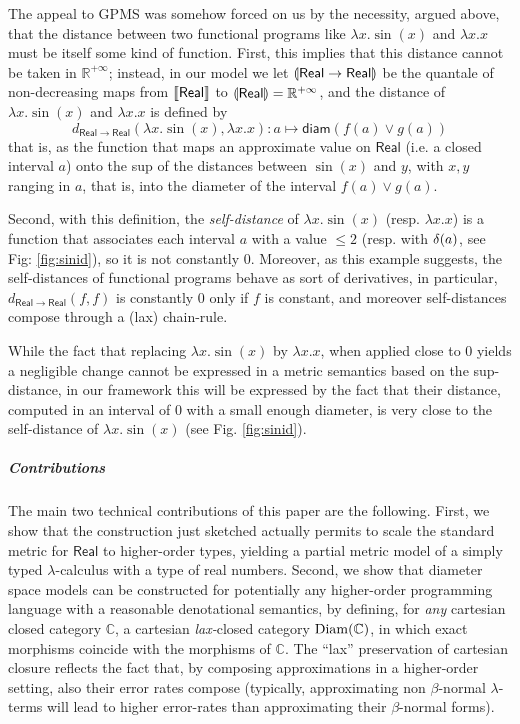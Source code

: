 The appeal to GPMS was somehow forced on us by the necessity, argued above, that the distance between two functional programs like $\lambda x.\sin(x)$ and $\lambda x.x$ must be itself some kind of function. First, this implies that this distance cannot be taken in $\mathbb R^{+\infty}$; instead, in our model 
we let $\llparenthesis \mathsf{Real}\to\mathsf{Real} \rrparenthesis$ be the quantale of non-decreasing maps from $\llbracket \mathsf{Real} \rrbracket$ to $\llparenthesis \mathsf{Real} \rrparenthesis=\mathbb R^{+\infty}$, and the distance of  $\lambda x.\sin(x)$ and $\lambda x.x$ is defined by 
$$ d_{\mathsf{Real}\to\mathsf{Real}}(\lambda x.\sin(x),\lambda x.x): a \mapsto \mathsf{diam}(f(a)\vee g(a))$$
that is, as the function that maps an approximate value on $\mathsf{Real}$ (i.e. a closed interval $a$) onto the sup of the distances between $\sin(x)$ and $ y$, with $x,y$ ranging in $a$, that is, into the diameter of the interval $f(a)\vee g(a)$. 


Second, with this definition, the \emph{self-distance} of $\lambda x.\sin(x)$ (resp. $\lambda x.x$)  is a function that associates each interval $a$ with a value $\leq 2$ (resp. with $\delta(a)$, see Fig: \ref{fig:sinid}), so it is not constantly 0. Moreover, as this example suggests, the self-distances of functional programs behave as sort of derivatives, in particular, $ d_{\mathsf{Real}\to\mathsf{Real}}(f,f)$ is constantly 0 only if $f$ is constant, and moreover self-distances 
 compose through a (lax) chain-rule.


While the fact that replacing  $\lambda x.\sin(x)$ by $\lambda x.x$, when applied close to 0 yields a negligible change cannot be expressed in a metric semantics based on the sup-distance, in our framework this will be expressed by the fact that their distance, computed in an interval of 0 with a small enough diameter, is very close to the {self-distance} of $\lambda x.\sin(x)$ (see Fig. \ref{fig:sinid}). 







\subparagraph*{Contributions}
The main two technical contributions of this paper are the following. First, we show that the construction just sketched actually permits to scale the standard  metric for $\mathsf{Real}$ to higher-order types, yielding a partial metric model of a simply typed $\lambda$-calculus with a type of real numbers.
Second, we show that diameter space models can be constructed for potentially any higher-order programming language with a reasonable denotational semantics, by defining, for \emph{any} cartesian closed category $\mathbb C$, a cartesian \emph{lax-}closed category $\operatorname{Diam}(\mathbb C)$, in which exact morphisms coincide with the morphisms of $\mathbb C$. The ``lax'' preservation of cartesian closure reflects the fact that, by composing approximations in a higher-order setting, also their error rates compose (typically, approximating non $\beta$-normal $\lambda$-terms will lead to higher error-rates than approximating their $\beta$-normal forms). 



